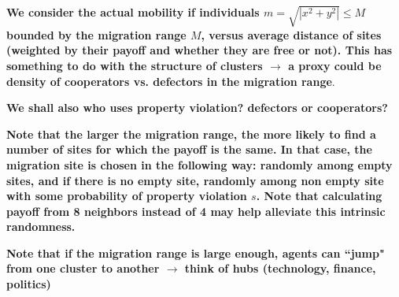 {\bf We consider the actual mobility if individuals $m = \sqrt{|x^2 + y^2|} \leqslant M$ bounded by the migration range $M$, versus average distance of sites (weighted by their payoff and whether they are free or not). This has something to do with the structure of clusters $\rightarrow$ a proxy could be density of cooperators vs. defectors in the migration range}.

{\bf We shall also who uses property violation? defectors or cooperators?}

{\bf Note that the larger the migration range, the more likely to find a number of sites for which the payoff is the same. In that case, the migration site is chosen in the following way: randomly among empty sites, and if there is no empty site, randomly among non empty site with some probability of property violation $s$. Note that calculating payoff from 8 neighbors instead of 4 may help alleviate this intrinsic randomness.}

{\bf Note that if the migration range is large enough, agents can ``jump" from one cluster to another $\rightarrow$  think of hubs (technology, finance, politics)}
